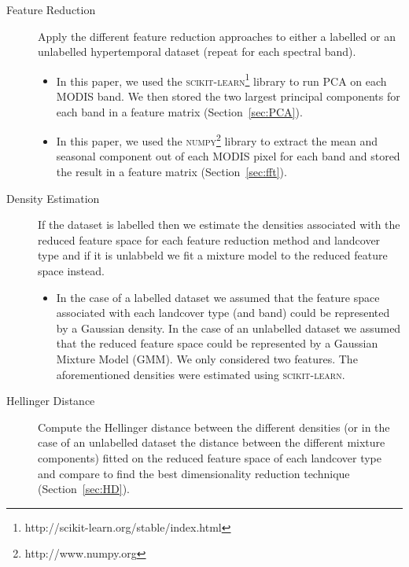 \documentclass{article}
\begin{document}
\begin{description}
 \item[Feature Reduction] Apply the different feature reduction approaches to either a labelled or an unlabelled hypertemporal dataset (repeat for each spectral band). 
 \begin{itemize}
  \item In this paper, we used the \textsc{scikit-learn}\footnote{http://scikit-learn.org/stable/index.html} library to run PCA on each MODIS band. We then stored the two largest principal components for each band in a feature matrix (Section~\ref{sec:PCA}). 
  \item In this paper, we used the \textsc{numpy}\footnote{http://www.numpy.org} library to extract the mean and seasonal component out of each MODIS pixel for each band and stored the result in a feature matrix (Section~\ref{sec:fft}). 
 \end{itemize}
 \item[Density Estimation] If the dataset is labelled then we estimate the densities associated with the reduced feature space for each feature reduction method and landcover type and if 
 it is unlabbeld we fit a mixture model to the reduced feature space instead.
 \begin{itemize}
  \item In the case of a labelled dataset 
  we assumed that the feature space associated with each landcover type (and band) could be represented by a Gaussian density. In the case 
  of an unlabelled dataset we assumed that the reduced feature space could be represented by a Gaussian Mixture Model (GMM). We only considered two features. The aforementioned densities were estimated 
  using \textsc{scikit-learn}.
 \end{itemize}
 \item[Hellinger Distance] Compute the Hellinger distance between the different densities (or in the case of an unlabelled dataset the distance between the different mixture components) fitted on the reduced feature space of each landcover type and compare to 
 find the best dimensionality reduction technique (Section~\ref{sec:HD}). 
\end{description}
\end{document}
